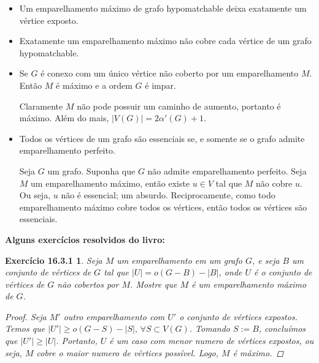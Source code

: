 \documentclass[a4paper,12pt]{article}
\newtheorem*{8}{Exercício 16.3.1}
\begin{document}
\begin{itemize}

\item Um emparelhamento máximo de grafo hypomatchable deixa exatamente um vértice exposto.

\item Exatamente um emparelhamento máximo não cobre cada vértice de um grafo hypomatchable.

\item Se $G$ é conexo com um único vértice não coberto por um emparelhamento $M$. Então $M$ é máximo e a ordem $G$ é impar.

Claramente $M$ não pode possuir um caminho de aumento, portanto é máximo. Além do mais, $|V(G)| = 2\alpha'(G) + 1$.

\item Todos os vértices de um grafo são essenciais se, e somente se o grafo admite emparelhamento perfeito.

Seja $G$ um grafo. Suponha que $G$ não admite emparelhamento perfeito. Seja $M$ um emparelhamento máximo, então existe $u \in V$ tal que $M$ não cobre $u$. Ou seja, $u$ não é essencial; um absurdo. Reciprocamente, como todo emparelhamento máximo cobre todos os vértices, então todos os vértices são essenciais.

\end{itemize}

\noindent \textbf{Alguns exercícios resolvidos do livro:}

\begin{8}

Seja $M$ um emparelhamento em um grafo $G$, e seja $B$ um conjunto de vértices de $G$ tal que $|U| = o(G - B) - |B|$, onde $U$ é o conjunto de vértices de $G$ não cobertos por $M$. Mostre que $M$ é um emparelhamento máximo de $G$.

\begin{proof}

Seja $M'$ outro emparelhamento com $U'$ o conjunto de vértices expostos. Temos que $|U'| \geq o(G - S) - |S|,\, \forall S \subset V(G)$. Tomando $S := B$, concluímos que $|U'| \geq |U|$. Portanto, $U$ é um caso com menor numero de vértices expostos, ou seja, $M$ cobre o maior numero de vértices possível. Logo, $M$ é máximo.

\end{proof}

\end{8}
\end{document}
